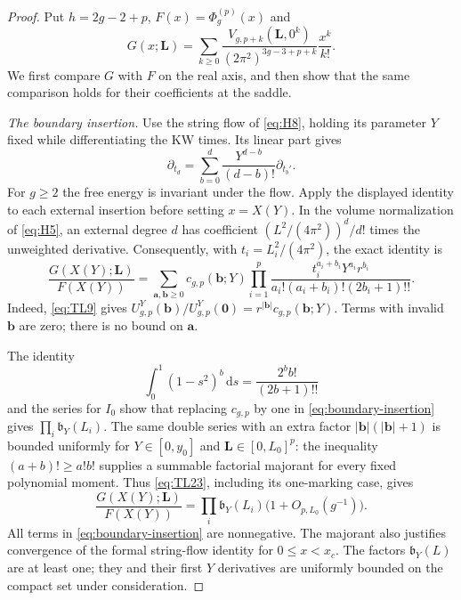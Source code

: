 \begin{proof}
Put $h=2g-2+p$, $F(x)=\Phi_g^{(p)}(x)$ and
\[
 G(x;\mathbf L)=\sum_{k\ge0}
 \frac{V_{g,p+k}(\mathbf L,0^k)}{(2\pi^2)^{3g-3+p+k}}
 \frac{x^k}{k!}.
\]
We first compare $G$ with $F$ on the real axis, and then show that the
same comparison holds for their coefficients at the saddle.

\emph{The boundary insertion.}
Use the string flow of \eqref{eq:H8}, holding its parameter $Y$ fixed
while differentiating the KW times. Its linear part gives
\[
 \partial_{t_d}=\sum_{b=0}^d\frac{Y^{d-b}}{(d-b)!}\partial_{t_b'}.
\]
For $g\ge2$ the free energy is invariant under the flow. Apply the
displayed identity to each external insertion before setting $x=X(Y)$.
In the volume normalization of \eqref{eq:H5}, an external degree $d$
has coefficient $(L^2/(4\pi^2))^d/d!$ times the unweighted derivative.
Consequently, with $t_i=L_i^2/(4\pi^2)$, the exact identity is
\begin{equation}
 \frac{G(X(Y);\mathbf L)}{F(X(Y))}
 =\sum_{\mathbf a,\mathbf b\ge0}c_{g,p}(\mathbf b;Y)
 \prod_{i=1}^p
 \frac{t_i^{a_i+b_i}Y^{a_i}r^{b_i}}
 {a_i!(a_i+b_i)!(2b_i+1)!!}.
 \label{eq:boundary-insertion}
\end{equation}
Indeed, \eqref{eq:TL9} gives
$U^Y_{g,p}(\mathbf b)/U^Y_{g,p}(\mathbf0)=r^{|\mathbf b|}c_{g,p}(\mathbf b;Y)$.
Terms with invalid $\mathbf b$ are zero; there is no bound on $\mathbf a$.

The identity
\[
 \int_0^1(1-s^2)^b\,\mathrm ds=\frac{2^b b!}{(2b+1)!!}
\]
and the series for $I_0$ show that replacing $c_{g,p}$ by one in
\eqref{eq:boundary-insertion} gives
$\prod_i\mathfrak b_Y(L_i)$. The same double series with an extra
factor $|\mathbf b|(|\mathbf b|+1)$ is bounded uniformly for
$Y\in[0,y_0]$ and $\mathbf L\in[0,L_0]^p$: the inequality
$(a+b)!\ge a!b!$ supplies a summable factorial majorant for every fixed
polynomial moment. Thus \eqref{eq:TL23}, including its one-marking case,
gives
\begin{equation}
 \frac{G(X(Y);\mathbf L)}{F(X(Y))}
 =\prod_i\mathfrak b_Y(L_i)\bigl(1+O_{p,L_0}(g^{-1})\bigr).
 \label{eq:boundary-real}
\end{equation}
All terms in \eqref{eq:boundary-insertion} are nonnegative. The
majorant also justifies convergence of the formal string-flow identity
for $0\le x<x_c$. The factors $\mathfrak b_Y(L)$ are at least one;
they and their first $Y$ derivatives are uniformly bounded on the
compact set under consideration.


\end{proof}
